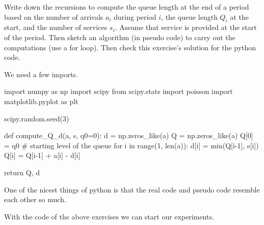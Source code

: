 \begin{exercise}
Write down the recursions to compute the queue length at the end of a period based on the number of arrivals $a_i$ during  period $i$, the queue length $Q_i$ at the start, and the number of services $s_i$. Assume that service is provided at the start of the period.   Then sketch an  algorithm (in pseudo code) to carry out the computations (use a for loop). Then check this exercise's solution for the python code.

  \begin{solution}
    We need a few imports.
\begin{pyverbatim}
import numpy as np
import scipy
from scipy.stats import poisson
import matplotlib.pyplot as plt

scipy.random.seed(3) 


def compute_Q_d(a, s, q0=0):
    d = np.zeros_like(a)
    Q = np.zeros_like(a)
    Q[0] = q0 # starting level of the queue
    for i in range(1, len(a)):
        d[i] = min(Q[i-1], s[i])
        Q[i] = Q[i-1] + a[i] - d[i]

    return Q, d
  
\end{pyverbatim}

    One of the nicest things of python is that  the real code and pseudo code resemble each other so much.
  \end{solution}
  
\end{exercise}


With the code of the above exercises we can start our experiments.

